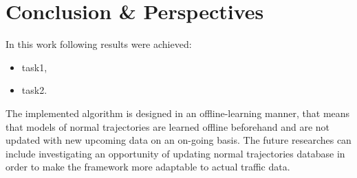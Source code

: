 \chapter{Conclusion \& Perspectives}
\label{ch:Conclusion & Perspectives}

In this work following results were achieved:
\begin{itemize}
	\item task1,
	\item task2.
\end{itemize}

\bigbreak
\bigbreak
The implemented algorithm is designed in an offline-learning manner, that means that models of normal trajectories are learned offline beforehand and are not updated with new upcoming data on an on-going basis. The future researches can include investigating an opportunity of updating normal trajectories database in order to make the framework more adaptable to actual traffic data.